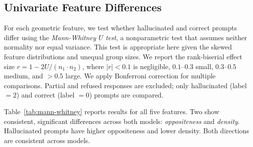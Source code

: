 
\subsection{Univariate Feature Differences}
\label{sec:univariate-features}

For each geometric feature, we test whether hallucinated and correct prompts differ using the \emph{Mann-Whitney $U$ test}, a nonparametric test that assumes neither normality nor equal variance. This test is appropriate here given the skewed feature distributions and unequal group sizes. We report the rank-biserial effect size $r = 1 - 2U/(n_1 \cdot n_2)$, where $|r| < 0.1$ is negligible, $0.1$--$0.3$ small, $0.3$--$0.5$ medium, and $> 0.5$ large. We apply Bonferroni correction for multiple comparisons. Partial and refused responses are excluded; only hallucinated (label $= 2$) and correct (label $= 0$) prompts are compared.

Table~\ref{tab:mann-whitney} reports results for all five features. Two show consistent, significant differences across both models: \emph{oppositeness} and \emph{density}. Hallucinated prompts have higher oppositeness and lower density. Both directions are consistent across models.

